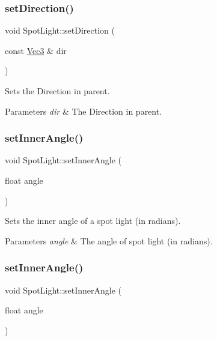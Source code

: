 \subsubsection{\texorpdfstring{set\+Direction()}{setDirection()}\hspace{0.1cm}{\footnotesize\ttfamily [2/2]}}
{\footnotesize\ttfamily void Spot\+Light\+::set\+Direction (\begin{DoxyParamCaption}\item[{const \hyperlink{classVec3}{Vec3} \&}]{dir }\end{DoxyParamCaption})}

Sets the Direction in parent.


\begin{DoxyParams}{Parameters}
{\em dir} & The Direction in parent. \\
\hline
\end{DoxyParams}
\mbox{\label{classSpotLight_a392e0d20d0482d33259b70b2dc175f66}} 
\subsubsection{\texorpdfstring{set\+Inner\+Angle()}{setInnerAngle()}\hspace{0.1cm}{\footnotesize\ttfamily [1/2]}}
{\footnotesize\ttfamily void Spot\+Light\+::set\+Inner\+Angle (\begin{DoxyParamCaption}\item[{float}]{angle }\end{DoxyParamCaption})}

Sets the inner angle of a spot light (in radians).


\begin{DoxyParams}{Parameters}
{\em angle} & The angle of spot light (in radians). \\
\hline
\end{DoxyParams}
\mbox{\label{classSpotLight_a392e0d20d0482d33259b70b2dc175f66}} 
\subsubsection{\texorpdfstring{set\+Inner\+Angle()}{setInnerAngle()}\hspace{0.1cm}{\footnotesize\ttfamily [2/2]}}
{\footnotesize\ttfamily void Spot\+Light\+::set\+Inner\+Angle (\begin{DoxyParamCaption}\item[{float}]{angle }\end{DoxyParamCaption})}

